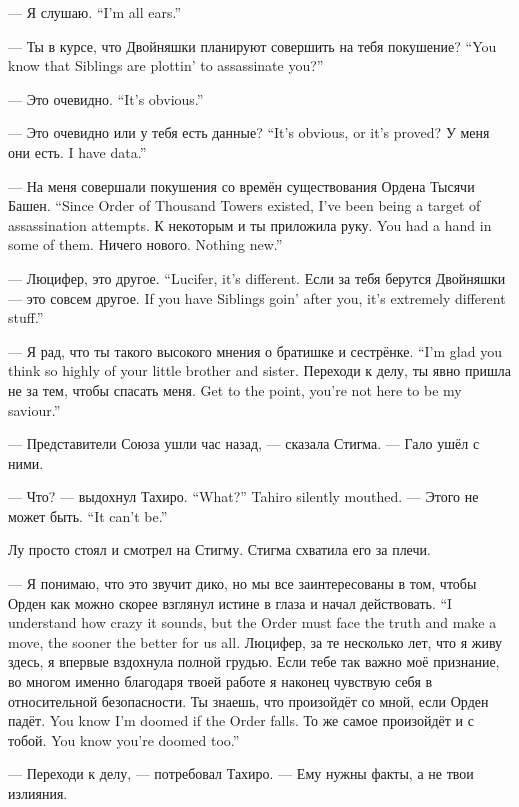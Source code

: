 {--- Я слушаю.}
{``I'm all ears.''}

{--- Ты в курсе, что Двойняшки планируют совершить на тебя покушение?}
{``You know that Siblings are plottin' to assassinate you?''}

{--- Это очевидно.}
{``It's obvious.''}

{--- Это очевидно или у тебя есть данные?}
{``It's obvious, or it's proved?}
{У меня они есть.}
{I have data.''}

{--- На меня совершали покушения со времён существования Ордена Тысячи Башен.}
{``Since Order of Thousand Towers existed, I've been being a target of assassination attempts.}
{К некоторым и ты приложила руку.}
{You had a hand in some of them.}
{Ничего нового.}
{Nothing new.''}

{--- Люцифер, это другое.}
{``Lucifer, it's different.}
{Если за тебя берутся Двойняшки --- это совсем другое.}
{If you have Siblings goin' after you, it's extremely different stuff.''}

{--- Я рад, что ты такого высокого мнения о братишке и сестрёнке.}
{``I'm glad you think so highly of your little brother and sister.}
{Переходи к делу, ты явно пришла не за тем, чтобы спасать меня.}
{Get to the point, you're not here to be my saviour.''}

--- Представители Союза ушли час назад, --- сказала Стигма.
--- Гало ушёл с ними.

{--- Что? --- выдохнул Тахиро.}
{``What?'' Tahiro silently mouthed.}
{--- Этого не может быть.}
{``It can't be.''}

Лу просто стоял и смотрел на Стигму.
Стигма схватила его за плечи.

{--- Я понимаю, что это звучит дико, но мы все заинтересованы в том, чтобы Орден как можно скорее взглянул истине в глаза и начал действовать.}
{``I understand how crazy it sounds, but the Order must face the truth and make a move, the sooner the better for us all.}
Люцифер, за те несколько лет, что я живу здесь, я впервые вздохнула полной грудью.
Если тебе так важно моё признание, во многом именно благодаря твоей работе я наконец чувствую себя в относительной безопасности.
{Ты знаешь, что произойдёт со мной, если Орден падёт.}
{You know I'm doomed if the Order falls.}
{То же самое произойдёт и с тобой.}
{You know you're doomed too.''}

--- Переходи к делу, --- потребовал Тахиро.
--- Ему нужны факты, а не твои излияния.

